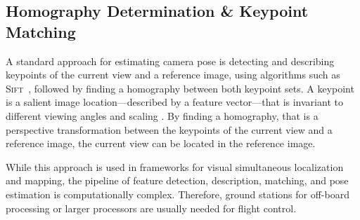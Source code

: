 \subsection{Homography Determination \& Keypoint Matching}
\label{sec:keypointmatching}

A standard approach for estimating camera pose is detecting and
describing keypoints of the current view and a reference image, using
algorithms such as \textsc{Sift}~\cite{lowe1999object}, followed by finding a homography between both keypoint sets. A
keypoint is a salient image location---described by a feature vector---that is invariant to different
viewing angles and scaling . By finding a homography, that is a perspective transformation between the keypoints of the current view and a reference image, the current view can be located in the reference image.


While this approach is used in frameworks for visual simultaneous localization and mapping, the pipeline of feature detection, description, matching, and pose estimation is computationally complex. Therefore, ground stations for off-board processing or larger processors are usually needed for flight control.  


